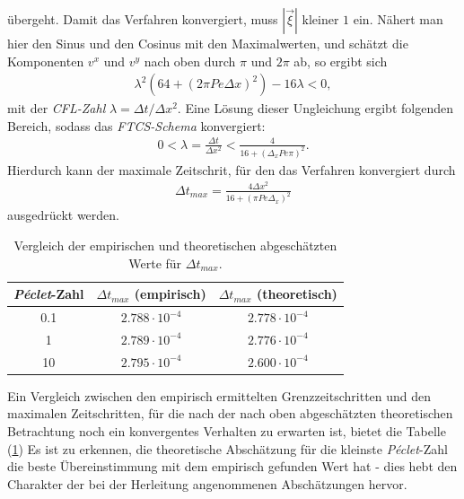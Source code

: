 \documentclass[12pt,a4paper,titlepage,headinclude,bibtotoc]{scrartcl}
\begin{document}
übergeht. Damit das Verfahren konvergiert, muss $|\vec{\xi}|$ kleiner $1$ ein. Nähert man hier den Sinus und den Cosinus mit den Maximalwerten, und schätzt die Komponenten $v^x$ und $v^y$ nach oben durch $\pi$ und $2\pi$ ab, so ergibt sich
\begin{align}
\lambda^2 \left(64 + (2 \pi Pe \Delta x)^2 \right) -16 \lambda <0,
\end{align}
mit der \textit{CFL-Zahl} $\lambda = \Delta t/\Delta x^2$.
Eine Lösung dieser Ungleichung ergibt folgenden Bereich, sodass das \textit{FTCS-Schema} konvergiert:
\begin{align}
0 < \lambda = \frac{\Delta t}{\Delta x^2} < \frac{4}{16 + (\Delta_x Pe \pi)^2}.
\end{align}
Hierdurch kann der maximale Zeitschrit, für den das Verfahren konvergiert durch
\begin{align}
\label{eq:neumann_delta_t_max}
\Delta t_{max} = \frac{4 \Delta x^2}{16 + \left(\pi Pe \Delta_x \right)^2}
\end{align}
ausgedrückt werden.

\begin{table}[H]
\centering
	\begin{tabular}{c|c|c}
		\textit{Péclet}-Zahl & $\Delta t_{max}$ (empirisch) & $\Delta t_{max}$ (theoretisch) \\ 
		\hline 
		\hline 
		0.1 & $2.788 \cdot 10^{-4}$  & $2.778 \cdot 10^{-4}$ \\ 
		\hline 
		1 & $2.789 \cdot 10^{-4}$ & $2.776 \cdot 10^{-4}$ \\ 
		\hline 
		10 & $2.795 \cdot 10^{-4}$ & $2.600  \cdot 10^{-4}$ \\ 
		\hline 
	\end{tabular} 
	\caption{Vergleich der empirischen und theoretischen abgeschätzten Werte für $\Delta t_{max}$.}
	\label{tab:delta_t_comp}
\end{table}

Ein Vergleich zwischen den empirisch ermittelten Grenzzeitschritten und den maximalen Zeitschritten, für die nach der nach oben abgeschätzten theoretischen Betrachtung noch ein konvergentes Verhalten zu erwarten ist, bietet die Tabelle (\ref{tab:delta_t_comp}) Es ist zu erkennen, die theoretische Abschätzung für die kleinste \textit{Péclet}-Zahl die beste Übereinstimmung mit dem empirisch gefunden Wert hat - dies hebt den Charakter der bei der Herleitung angenommenen Abschätzungen hervor.  
\\


\newpage
\end{document}

